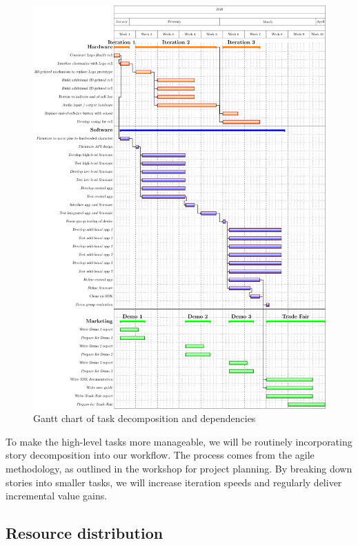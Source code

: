 \documentclass{article}
\begin{document}
\begin{figure}[h]
\vskip 5mm
\begin{center}
\centerline{\includegraphics[height=\textheight]{figs/gantttest}}
\caption{Gantt chart of task decomposition and dependencies}
\label{fig:gantt}
\end{center}
\vskip -5mm
\end{figure} 

To make the high-level tasks more manageable, we will be routinely incorporating story decomposition into our workflow. The process comes from the agile methodology, as outlined in the workshop for project planning. By breaking down stories into smaller tasks, we will increase iteration speeds and regularly deliver incremental value gains.

\subsection{Resource distribution}
\end{document}
